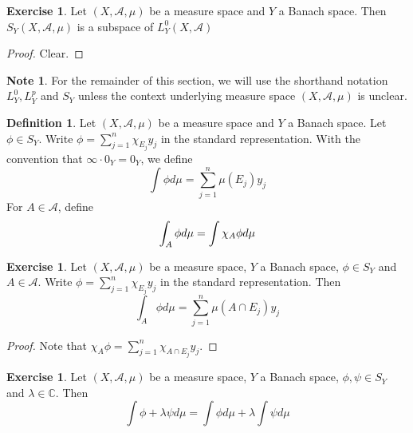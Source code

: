 \documentclass[12pt]{amsart}
\theoremstyle{definition}
\newtheorem{defn}[definition]{Definition}
\newtheorem{note}[definition]{Note}
\newtheorem{ex}[definition]{Exercise}
\newcommand{\lam}{\lambda}
\newcommand{\C}{\mathbb{C}}
\newcommand{\MA}{\mathcal{A}}
\newcommand{\lex}[1]{\label{ex:#1}}
\newcommand{\ld}[1]{\label{defn:#1}}
\begin{document}
	\begin{ex} \lex{00000} 
	Let $(X, \MA, \mu)$ be a measure space and $Y$ a Banach space. Then $S_Y(X, \MA, \mu)$ is a subspace of $L_Y^0(X, \MA)$
	\end{ex}
	
	\begin{proof}
	Clear.
	\end{proof}
	
	\begin{note}
	For the remainder of this section, we will use the shorthand notation $L^0_Y, L^p_Y$ and $S_Y$ unless the context underlying measure space $(X, \MA, \mu)$ is unclear.
	\end{note}
	
	\begin{defn} \ld{00000} 
	Let $(X, \MA, \mu)$ be a measure space and $Y$ a Banach space. Let $\phi \in S_Y$. Write $\phi = \sum\limits_{j=1}^n\chi_{E_j}y_j$ in the standard representation. With the convention that $\infty \cdot 0_Y = 0_Y$, we define $$\int \phi d\mu = \sum\limits_{j=1}^n \mu(E_j)y_j $$ For $A \in \MA$, define  $$\int_A \phi d \mu = \int \chi_A \phi d\mu \\$$
	\end{defn}
	
	\begin{ex} \lex{00000} 
	Let $(X, \MA, \mu)$ be a measure space, $Y$ a Banach space, $\phi \in S_Y$ and $A \in \MA$. Write $\phi = \sum\limits_{j=1}^n\chi_{E_j}y_j$ in the standard representation. Then $$\int_A \phi d\mu = \sum_{j=1}^n \mu(A \cap E_j)y_j$$
	\end{ex}
	
	\begin{proof}
	Note that $\chi_A \phi = \sum\limits_{j=1}^n\chi_{A \cap E_j}y_j$.
	\end{proof}		
	
	\begin{ex} \lex{00000} 
	Let $(X, \MA, \mu)$ be a measure space, $Y$ a Banach space, $\phi, \psi \in S_Y$ and $\lam \in \C$. Then $$\int \phi + \lam \psi d\mu = \int \phi d \mu + \lam \int \psi d\mu $$
	\end{ex}
	
\end{document}
